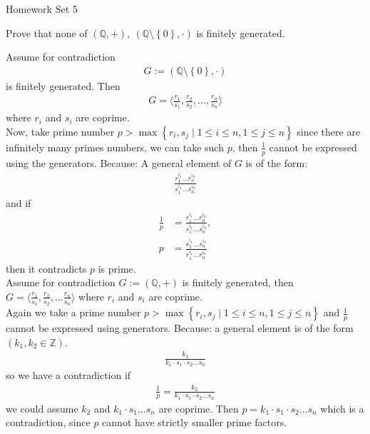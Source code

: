 \documentclass{article}
\begin{document}
\maketitle
Homework Set 5
\pagebreak

\begin{homeworkProblem}
    Prove that none of $(\mathbb{Q}, +), \ (\mathbb{Q} \setminus \left\{ 0 \right\}, \cdot)$ 
    is finitely generated.\\
    \solution

    Assume for contradiction\\
    \begin{align}
        G := (\mathbb{Q} \setminus \left\{ 0 \right\}, \cdot)
    \end{align}
    is finitely generated. Then
    \begin{align}
        G = \langle \frac{ r_1 }{ s_1 }, \frac{ r_2 }{ s_2 }, \ldots, \frac{ r_n }{ s_n }\rangle 
    \end{align}
    where $r_i$ and $s_i$ are coprime.\\
    Now, take prime number $p > \max \left\{ r_i, s_j \mid 1 \leq i \leq n, 1 \leq j \leq n \right\}$
    since there are infinitely many primes numbers, 
    we can take such $p$, then $\frac{ 1 }{ p }$ cannot 
    be expressed using the generators. Because:
    A general element of $G$ is of the form:
    \begin{align}
        \frac{ r_1^{i_1}\ldots r_n^{i_n} }{ s_1^{i_1}\ldots s_n^{i_n} }
    \end{align}
    and if 
    \begin{align}
        \frac{ 1 }{ p } &= \frac{ r_1^{i_1}\ldots r_n^{i_n} }{ s_1^{i_1}\ldots s_n^{i_n} },\\
    p &= \frac{ s_1^{i_1}\ldots s_n^{i_n} }{r_1^{i_1}\ldots r_n^{i_n}} 
    \end{align}
    then it contradicts $p$ is prime.\\

    Assume for contradiction $G:= (\mathbb{Q}, +)$ is finitely generated,
    then $G = \langle \frac{ r_1 }{ s_1 }, \frac{ r_2 }{ s_2 }, \ldots \frac{ r_n }{ s_n }\rangle$
    where $r_i$ and $s_i$ are coprime.\\
    Again we take a prime number $p > \max \left\{ r_i, s_j \mid 1 \leq i \leq n, 1 \leq j \leq n \right\}$
    and $\frac{ 1 }{ p }$ cannot be expressed using generators. 
    Because: a general element is of the form $(k_1, k_2 \in \mathbb{Z})$.
    \begin{align}
        \frac{ k_2 }{ k_1 \cdot s_1 \cdot s_2 \ldots s_n }
    \end{align}
    so we have a contradiction if 
    \begin{align}
        \frac{ 1 }{ p } = \frac{ k_2 }{ k_1 \cdot s_1 \cdot s_2 \ldots s_n }
    \end{align}
    we could assume $k_2$ and $k_1 \cdot s_1 \ldots s_n$ are 
    coprime. Then $p = k_1 \cdot s_1 \cdot s_2 \ldots s_n$
    which is a contradiction, since $p$ cannot 
    have strictly smaller prime factors.
    

\end{homeworkProblem}
\end{document}
